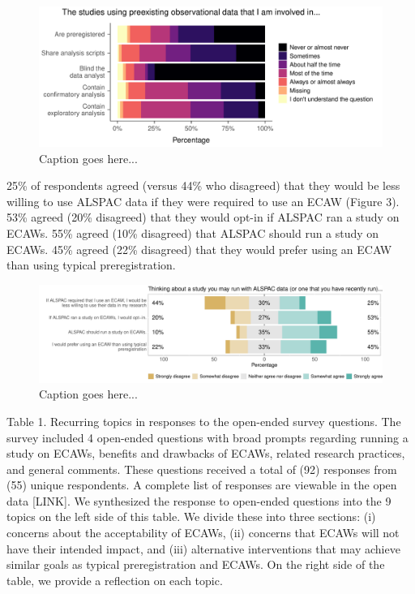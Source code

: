 \documentclass[
  man,floatsintext]{apa6}
\begin{document}
\begin{figure}

{\centering \includegraphics[width=1\linewidth]{manuscript_files/figure-latex/methodPlot-1} 

}

\caption{Caption goes here...}\label{fig:methodPlot}
\end{figure}

25\% of respondents agreed (versus 44\% who disagreed) that they would be less willing to use ALSPAC data if they were required to use an ECAW (Figure 3). 53\% agreed (20\% disagreed) that they would opt-in if ALSPAC ran a study on ECAWs. 55\% agreed (10\% disagreed) that ALSPAC should run a study on ECAWs. 45\% agreed (22\% disagreed) that they would prefer using an ECAW than using typical preregistration.

\begin{figure}

{\centering \includegraphics[width=1\linewidth]{manuscript_files/figure-latex/alspacPlot-1} 

}

\caption{Caption goes here...}\label{fig:alspacPlot}
\end{figure}

Table 1. Recurring topics in responses to the open-ended survey questions. The survey included 4 open-ended questions with broad prompts regarding running a study on ECAWs, benefits and drawbacks of ECAWs, related research practices, and general comments. These questions received a total of (92) responses from (55) unique respondents. A complete list of responses are viewable in the open data {[}LINK{]}. We synthesized the response to open-ended questions into the 9 topics on the left side of this table. We divide these into three sections: (i) concerns about the acceptability of ECAWs, (ii) concerns that ECAWs will not have their intended impact, and (iii) alternative interventions that may achieve similar goals as typical preregistration and ECAWs. On the right side of the table, we provide a reflection on each topic.
\end{document}
